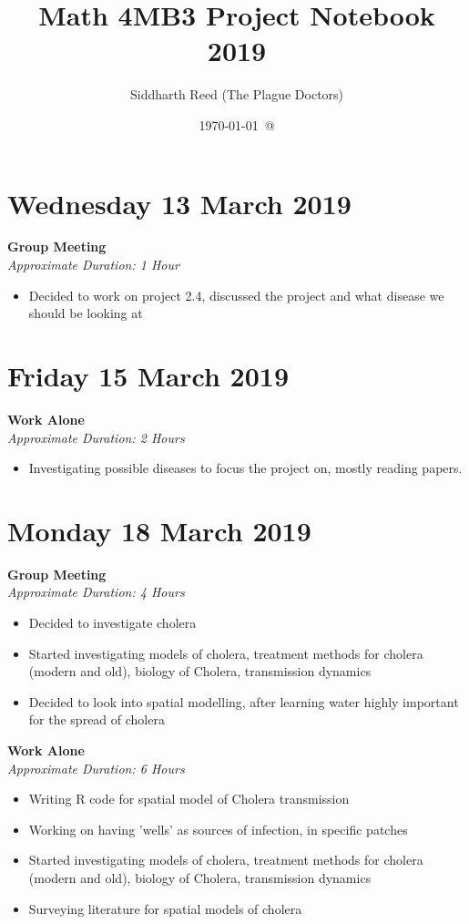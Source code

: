 \documentclass[12pt]{article}\usepackage[]{graphicx}\usepackage[]{color}
\title{Math 4MB3 Project Notebook 2019}
\author{Siddharth Reed (The Plague Doctors)}
\date{\today\ @ \thistime}
\begin{document}
\maketitle
\section*{Wednesday 13 March 2019}
\textbf{Group Meeting} \\
\emph{Approximate Duration: 1 Hour}
\begin{itemize}
    \item Decided to work on project 2.4, discussed the project and what disease we should be looking at
\end{itemize}
\section*{Friday 15 March 2019}
\textbf{Work Alone}\\
\emph{Approximate Duration: 2 Hours}
\begin{itemize}
    \item Investigating possible diseases to focus the project on, mostly reading papers.
\end{itemize}
\section*{Monday 18 March 2019}
\textbf{Group Meeting} \\
\emph{Approximate Duration: 4 Hours}
\begin{itemize}
    \item Decided to investigate cholera
    \item Started investigating models of cholera, treatment methods for cholera (modern and old), biology of Cholera, transmission dynamics
    \item Decided to look into spatial modelling, after learning water highly important for the spread of cholera
\end{itemize}
\textbf{Work Alone} \\
\emph{Approximate Duration: 6 Hours}
\begin{itemize}
    \item Writing R code for spatial model of Cholera transmission
    \item Working on having 'wells' as sources of infection, in specific patches
    \item Started investigating models of cholera, treatment methods for cholera (modern and old), biology of Cholera, transmission dynamics
    \item Surveying literature for spatial models of cholera
\end{itemize}
\end{document}
